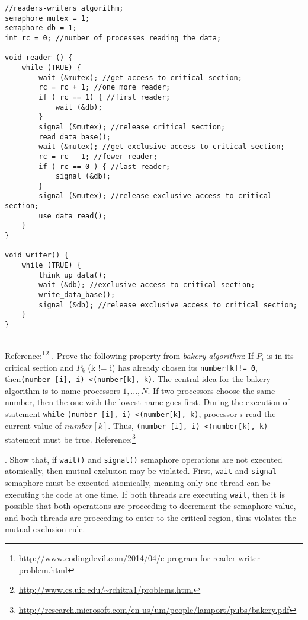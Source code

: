 \documentclass[12pt]{article}
\begin{document}
\begin{lstlisting}
//readers-writers algorithm;
semaphore mutex = 1; 
semaphore db = 1;
int rc = 0; //number of processes reading the data;

void reader () {
	while (TRUE) { 
		wait (&mutex); //get access to critical section;
		rc = rc + 1; //one more reader;
		if ( rc == 1) { //first reader;
			wait (&db); 
		}
		signal (&mutex); //release critical section;
		read_data_base();
		wait (&mutex); //get exclusive access to critical section;
		rc = rc - 1; //fewer reader;
		if ( rc == 0 ) { //last reader;
			signal (&db);
		}
		signal (&mutex); //release exclusive access to critical section;
		use_data_read();
	}
}

void writer() {
	while (TRUE) {
		think_up_data();
		wait (&db); //exclusive access to critical section;
		write_data_base();
		signal (&db); //release exclusive access to critical section;
	}
}


\end{lstlisting}
Reference:\footnote{\url{http://www.codingdevil.com/2014/04/c-program-for-reader-writer-problem.html}}\footnote{\url{http://www.cs.uic.edu/~rchitra1/problems.html}}\hfill \break
\noindent
{}. Prove the following property from \textit{bakery algorithm}:
If $P_i$ is in its critical section and $P_k$ (k != i) has already chosen its 
\texttt{number[k]!= 0}, then\texttt{(number [i], i) \textless  (number[k], k)}.\hfill \break
\break
\noindent
The central idea for the bakery algorithm is to name processors $1, ..., N$. If two processors choose the same number, then the one with the lowest name goes first. \hfill \break
During the execution of statement \texttt{while} \texttt{(number [i], i) \textless  (number[k], k)}, processor $i$ read the current value of $number[k]$. Thus, \texttt{(number [i], i) \textless  (number[k], k)} statement must be true. \hfill\break
\noindent
\break
Reference:\footnote{\url{http://research.microsoft.com/en-us/um/people/lamport/pubs/bakery.pdf}}

\noindent
{}. Show that, if \texttt{wait()} and \texttt{signal()} semaphore operations are not executed atomically, then mutual exclusion may be violated. \hfill \break
\break
\noindent
First, \texttt{wait} and \texttt{signal} semaphore must be executed atomically, meaning only one thread can be executing the code at one time. If both threads are executing \texttt{wait}, then it is possible that both operations are proceeding to decrement the semaphore value, and both threads are proceeding to enter to the critical region, thus violates the mutual exclusion rule. \hfill \break
\end{document}
